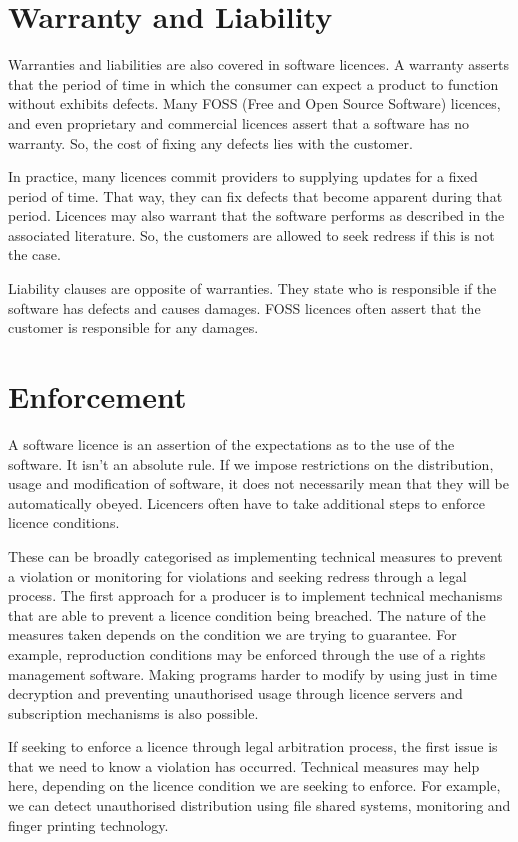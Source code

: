 \documentclass[a4paper, openany]{memoir}
\begin{document}
\section{Warranty and Liability}
Warranties and liabilities are also covered in software licences. A warranty asserts that the period of time in which the consumer can expect a product to function without exhibits defects. Many FOSS (Free and Open Source Software) licences, and even proprietary and commercial licences assert that a software has no warranty. So, the cost of fixing any defects lies with the customer.

In practice, many licences commit providers to supplying updates for a fixed period of time. That way, they can fix defects that become apparent during that period. Licences may also warrant that the software performs as described in the associated literature. So, the customers are allowed to seek redress if this is not the case.

Liability clauses are opposite of warranties. They state who is responsible if the software has defects and causes damages. FOSS licences often assert that the customer is responsible for any damages.

\section{Enforcement}
A software licence is an assertion of the expectations as to the use of the software. It isn't an absolute rule. If we impose restrictions on the distribution, usage and modification of software, it does not necessarily mean that they will be automatically obeyed. Licencers often have to take additional steps to enforce licence conditions.

These can be broadly categorised as implementing technical measures to prevent a violation or monitoring for violations and seeking redress through a legal process. The first approach for a producer is to implement technical mechanisms that are able to prevent a licence condition being breached. The nature of the measures taken depends on the condition we are trying to guarantee. For example, reproduction conditions may be enforced through the use of a rights management software. Making programs harder to modify by using just in time decryption and preventing unauthorised usage through licence servers and subscription mechanisms is also possible.

If seeking to enforce a licence through legal arbitration process, the first issue is that we need to know a violation has occurred. Technical measures may help here, depending on the licence condition we are seeking to enforce. For example, we can detect unauthorised distribution using file shared systems,  monitoring and finger printing technology.
\end{document}
